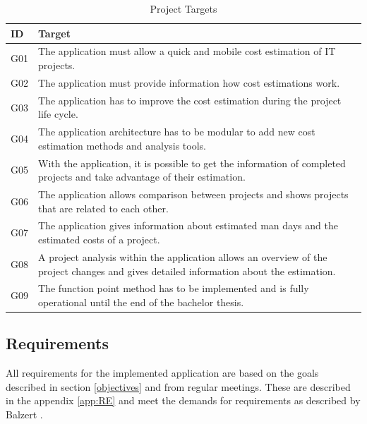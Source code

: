 \begin{table}[h]
	\centering 
	\setlength{\tabcolsep}{4pt}
	\begin{tabular}{|l||p{14cm}|}\hline
		ID		& Target\\ \hline\hline
		G01  	& The application must allow a quick and mobile cost estimation of IT projects.\\ \hline
		G02  	& The application must provide information how cost estimations work.\\ \hline
		G03  	& The application has to improve the cost estimation during  the project life cycle.\\ \hline
		G04  	& The application architecture has to be modular to add new cost estimation methods and analysis tools.\\ \hline
		G05  	& With the application, it is possible to get the information of completed projects and take advantage of their estimation.\\ \hline
		G06  	& The application allows comparison between projects and shows projects that are related to each other.\\ \hline
		G07  	& The application gives information about estimated man days and the estimated costs of a project.\\ \hline
		G08  	& A project analysis within the application allows an overview of the project changes and gives detailed information about the estimation.\\ \hline
		G09  	& The function point method has to be implemented and is fully operational until the end of the bachelor thesis.\\ \hline
	\end{tabular} 
	\caption{Project Targets} 
	\label{projecttargets} 
\end{table}

\subsection{Requirements}\label{requirements}

All requirements for the implemented application are based on the goals described in section \ref{objectives} and from regular meetings. These are described in the appendix \ref{app:RE} and meet the demands for requirements as described by Balzert \cite{basiskonzepteRE}.\\


